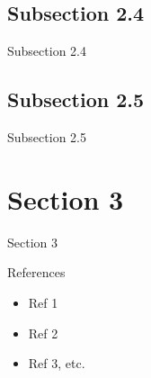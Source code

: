 \documentclass[aspectratio=169,11pt]{beamer}
\begin{document}
  
  \subsection{Subsection 2.4}
  \begin{frame}{Subsection 2.4}
  	\lipsum[1]
  \end{frame}
  
     
  \subsection{Subsection 2.5}
  \begin{frame}{Subsection 2.5}
  	\lipsum[1]
  \end{frame}
  




\section{Section 3}

\begin{frame}[t,plain]{Section 3}
	\lipsum[1]
\end{frame}







\begin{frame}[t, plain]{References}
  \begin{itemize}
    \item Ref 1
    \item Ref 2
    \item Ref 3, etc.
  \end{itemize}
\end{frame}
    
    

    
\end{document}
